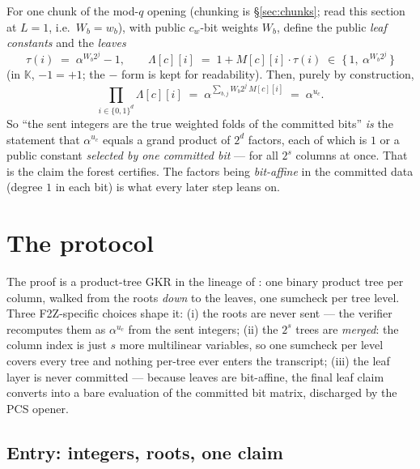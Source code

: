 \documentclass[11pt]{article}
\newcommand{\K}{\mathbb{K}}            %
\newcommand{\bits}{\{0,1\}}
\newcommand{\cw}{c_w}
\theoremstyle{definition}
\begin{document}
For one chunk of the mod-$q$ opening (chunking is \S\ref{sec:chunks};
read this section at $L = 1$, i.e.\ $W_b = w_b$), with public $\cw$-bit
weights $W_b$, define the public \emph{leaf constants} and the
\emph{leaves}
\begin{equation}\label{eq:leaves}
  \tau(i) \;=\; \alpha^{W_b 2^j} - 1,
  \qquad
  \Lambda[c][i] \;=\; 1 + M[c][i]\cdot\tau(i)
  \;\in\; \{\,1,\ \alpha^{W_b 2^j}\,\}
\end{equation}
(in $\K$, $-1 = +1$; the $-$ form is kept for readability).  Then,
purely by construction,
\begin{equation}\label{eq:product}
  \prod_{i \in \bits^d} \Lambda[c][i]
  \;=\; \alpha^{\sum_{b,j} W_b 2^j\, M[c][i]}
  \;=\; \alpha^{u_c}.
\end{equation}
So ``the sent integers are the true weighted folds of the committed
bits'' \emph{is} the statement that $\alpha^{u_c}$ equals a grand
product of $2^d$ factors, each of which is $1$ or a public constant
\emph{selected by one committed bit} --- for all $2^s$ columns at once.
That is the claim the forest certifies.  The factors being
\emph{bit-affine} in the committed data (degree $1$ in each bit) is what
every later step leans on.

\section{The protocol}
\label{sec:protocol}

The proof is a product-tree GKR in the lineage of
\cite{GKR15,Thaler13}: one binary product tree per column, walked from
the roots \emph{down} to the leaves, one sumcheck per tree level.  Three
F2Z-specific choices shape it:
(i) the roots are never sent --- the verifier recomputes them as
$\alpha^{u_c}$ from the sent integers;
(ii) the $2^s$ trees are \emph{merged}: the column index is just $s$
more multilinear variables, so one sumcheck per level covers every tree
and nothing per-tree ever enters the transcript;
(iii) the leaf layer is never committed --- because leaves are
bit-affine, the final leaf claim converts into a bare evaluation of the
committed bit matrix, discharged by the PCS opener.

\subsection{Entry: integers, roots, one claim}
\label{sec:entry}
\end{document}
